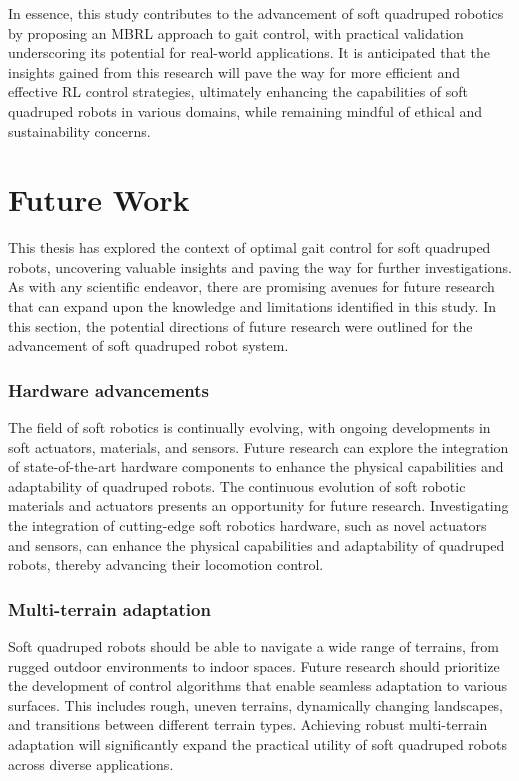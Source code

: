 In essence, this study contributes to the advancement of soft quadruped robotics by proposing an MBRL approach to gait control, with practical validation underscoring its potential for real-world applications. It is anticipated that the insights gained from this research will pave the way for more efficient and effective RL control strategies, ultimately enhancing the capabilities of soft quadruped robots in various domains, while remaining mindful of ethical and sustainability concerns.

\section{Future Work}
This thesis has explored the context of optimal gait control for soft quadruped robots, uncovering valuable insights and paving the way for further investigations. As with any scientific endeavor, there are promising avenues for future research that can expand upon the knowledge and limitations identified in this study. In this section, the potential directions of future research were outlined for the advancement of soft quadruped robot system.

\subsubsection*{Hardware advancements}
The field of soft robotics is continually evolving, with ongoing developments in soft actuators, materials, and sensors. Future research can explore the integration of state-of-the-art hardware components to enhance the physical capabilities and adaptability of quadruped robots. The continuous evolution of soft robotic materials and actuators presents an opportunity for future research. Investigating the integration of cutting-edge soft robotics hardware, such as novel actuators and sensors, can enhance the physical capabilities and adaptability of quadruped robots, thereby advancing their locomotion control.

\subsubsection*{Multi-terrain adaptation}
Soft quadruped robots should be able to navigate a wide range of terrains, from rugged outdoor environments to indoor spaces. Future research should prioritize the development of control algorithms that enable seamless adaptation to various surfaces. This includes rough, uneven terrains, dynamically changing landscapes, and transitions between different terrain types. Achieving robust multi-terrain adaptation will significantly expand the practical utility of soft quadruped robots across diverse applications.

